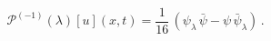 \begin{equation*}
{\mathcal{P}}^{(-1)}(\lambda)[u](x,t) = \frac{1}{16}\,\left(\psi_\lambda
\,\bar{\psi}-\psi\,\bar{\psi}_\lambda \right)\,.
\end{equation*}

